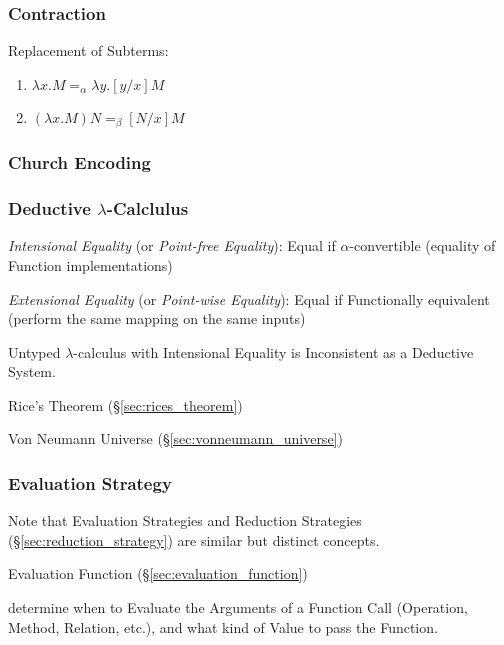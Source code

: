 \subsubsection{Contraction}\label{sec:contraction}\cite{seldin03}

Replacement of Subterms:
\begin{enumerate}
  \item $\lambda x . M =_\alpha \lambda y . [y/x]M$
  \item $(\lambda x . M)N =_\beta [N/x]M$
\end{enumerate}



\subsubsection{Church Encoding}\label{sec:church_encoding}

\subsubsection{Deductive $\lambda$-Calclulus}\label{sec:deductive_lambda}

\emph{Intensional Equality} (or \emph{Point-free Equality}): Equal if
$\alpha$-convertible (equality of Function implementations)

\emph{Extensional Equality} (or \emph{Point-wise Equality}): Equal if
Functionally equivalent (perform the same mapping on the same inputs)

Untyped $\lambda$-calculus with Intensional Equality is Inconsistent
as a Deductive System.

Rice's Theorem (\S\ref{sec:rices_theorem})

Von Neumann Universe (\S\ref{sec:vonneumann_universe})



\subsubsection{Evaluation Strategy}\label{sec:evaluation_strategy}

\fist Note that Evaluation Strategies and Reduction Strategies
(\S\ref{sec:reduction_strategy}) are similar but distinct concepts.

Evaluation Function (\S\ref{sec:evaluation_function})

determine when to Evaluate the Arguments of a Function Call
(Operation, Method, Relation, etc.), and what kind of Value to pass
the Function.

